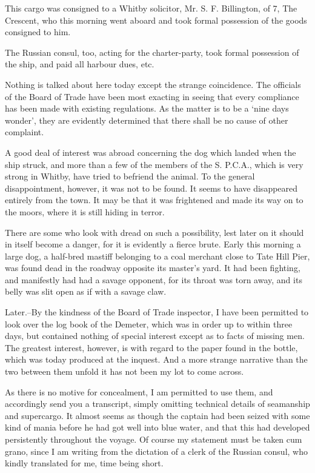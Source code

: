 This cargo was consigned to a Whitby solicitor, Mr. S. F. Billington, of 7, The Crescent, who this morning went aboard and took formal possession of the goods consigned to him. 

The Russian consul, too, acting for the charter-party, took formal possession of the ship, and paid all harbour dues, etc. 

Nothing is talked about here today except the strange coincidence. The officials of the Board of Trade have been most exacting in seeing that every compliance has been made with existing regulations. As the matter is to be a `nine days wonder', they are evidently determined that there shall be no cause of other complaint. 

A good deal of interest was abroad concerning the dog which landed when the ship struck, and more than a few of the members of the S. P.C.A., which is very strong in Whitby, have tried to befriend the animal. To the general disappointment, however, it was not to be found. It seems to have disappeared entirely from the town. It may be that it was frightened and made its way on to the moors, where it is still hiding in terror. 

There are some who look with dread on such a possibility, lest later on it should in itself become a danger, for it is evidently a fierce brute. Early this morning a large dog, a half-bred mastiff belonging to a coal merchant close to Tate Hill Pier, was found dead in the roadway opposite its master's yard. It had been fighting, and manifestly had had a savage opponent, for its throat was torn away, and its belly was slit open as if with a savage claw. 

Later.--By the kindness of the Board of Trade inspector, I have been permitted to look over the log book of the Demeter, which was in order up to within three days, but contained nothing of special interest except as to facts of missing men. The greatest interest, however, is with regard to the paper found in the bottle, which was today produced at the inquest. And a more strange narrative than the two between them unfold it has not been my lot to come across. 

As there is no motive for concealment, I am permitted to use them, and accordingly send you a transcript, simply omitting technical details of seamanship and supercargo. It almost seems as though the captain had been seized with some kind of mania before he had got well into blue water, and that this had developed persistently throughout the voyage. Of course my statement must be taken cum grano, since I am writing from the dictation of a clerk of the Russian consul, who kindly translated for me, time being short. 

